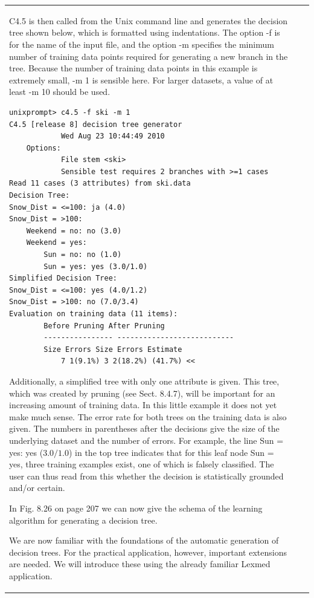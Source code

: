 \documentclass[10pt]{book}
\begin{document}
\begin{center}
\begin{tabular}{|l|l|l|}
C4.5 is then called from the Unix command line and generates the decision tree shown below, which is formatted using indentations. The option -f is for the name of the input file, and the option -m specifies the minimum number of training data points required for generating a new branch in the tree. Because the number of training data points in this example is extremely small, -m 1 is sensible here. For larger datasets, a value of at least -m 10 should be used.
\begin{verbatim}
unixprompt> c4.5 -f ski -m 1
C4.5 [release 8] decision tree generator
            Wed Aug 23 10:44:49 2010
    Options:
            File stem <ski>
            Sensible test requires 2 branches with >=1 cases
Read 11 cases (3 attributes) from ski.data
Decision Tree:
Snow_Dist = <=100: ja (4.0)
Snow_Dist = >100:
    Weekend = no: no (3.0)
    Weekend = yes:
        Sun = no: no (1.0)
        Sun = yes: yes (3.0/1.0)
Simplified Decision Tree:
Snow_Dist = <=100: yes (4.0/1.2)
Snow_Dist = >100: no (7.0/3.4)
Evaluation on training data (11 items):
        Before Pruning After Pruning
        ---------------- ---------------------------
        Size Errors Size Errors Estimate
            7 1(9.1%) 3 2(18.2%) (41.7%) <<
\end{verbatim}

Additionally, a simplified tree with only one attribute is given. This tree, which was created by pruning (see Sect. 8.4.7), will be important for an increasing amount of training data. In this little example it does not yet make much sense. The error rate for both trees on the training data is also given. The numbers in parentheses after the decisions give the size of the underlying dataset and the number of errors. For example, the line Sun = yes: yes ($3.0/1.0$) in the top tree indicates that for this leaf node Sun = yes, three training examples exist, one of which is falsely classified. The user can thus read from this whether the decision is statistically grounded and/or certain.

In Fig. 8.26 on page 207 we can now give the schema of the learning algorithm for generating a decision tree.

We are now familiar with the foundations of the automatic generation of decision trees. For the practical application, however, important extensions are needed. We will introduce these using the already familiar Lexmed application.


\end{tabular}
\end{center}
\end{document}
